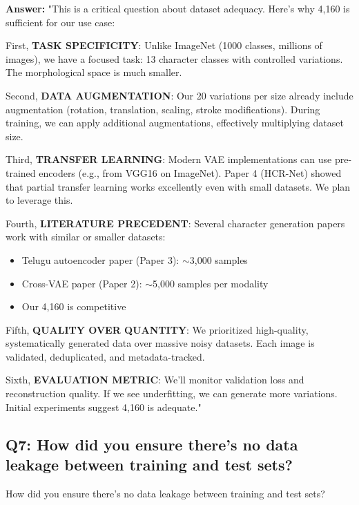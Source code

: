 \documentclass[11pt,a4paper]{article}
\begin{document}
\begin{answerbox}
\textbf{Answer:} "This is a critical question about dataset adequacy. Here's why 4,160 is sufficient for our use case:

First, \textbf{TASK SPECIFICITY}: Unlike ImageNet (1000 classes, millions of images), we have a focused task: 13 character classes with controlled variations. The morphological space is much smaller.

Second, \textbf{DATA AUGMENTATION}: Our 20 variations per size already include augmentation (rotation, translation, scaling, stroke modifications). During training, we can apply additional augmentations, effectively multiplying dataset size.

Third, \textbf{TRANSFER LEARNING}: Modern VAE implementations can use pre-trained encoders (e.g., from VGG16 on ImageNet). Paper 4 (HCR-Net) showed that partial transfer learning works excellently even with small datasets. We plan to leverage this.

Fourth, \textbf{LITERATURE PRECEDENT}: Several character generation papers work with similar or smaller datasets:
\begin{itemize}
\item Telugu autoencoder paper (Paper 3): $\sim$3,000 samples
\item Cross-VAE paper (Paper 2): $\sim$5,000 samples per modality
\item Our 4,160 is competitive
\end{itemize}

Fifth, \textbf{QUALITY OVER QUANTITY}: We prioritized high-quality, systematically generated data over massive noisy datasets. Each image is validated, deduplicated, and metadata-tracked.

Sixth, \textbf{EVALUATION METRIC}: We'll monitor validation loss and reconstruction quality. If we see underfitting, we can generate more variations. Initial experiments suggest 4,160 is adequate."
\end{answerbox}

\subsection{Q7: How did you ensure there's no data leakage between training and test sets?}

\begin{qbox}[title=Question]
How did you ensure there's no data leakage between training and test sets?
\end{qbox}
\end{document}
